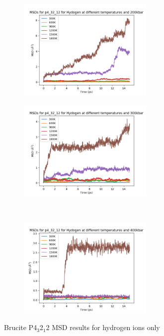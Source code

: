\documentclass[a4paper,12pt]{article}
\begin{document}
\begin{figure}[h!!!!!!!!!!!!!!!!!!!!!!!!]
	\centering
	\begin{subfigure}[t]{0.5\textwidth}
		\centering
		\includegraphics[width=6.5cm]{figures/p4_msd_H_p200.png}
		\label{Fig9a}
	\end{subfigure}%
	\begin{subfigure}[t]{0.5\textwidth}
		\centering
		\includegraphics[width=6.5cm]{figures/p4_msd_H_p300.png}
		\label{Fig9b}
	\end{subfigure}%
	\\
	\begin{subfigure}[t]{0.5\textwidth}
		\centering
		\includegraphics[width=6.5cm]{figures/p4_msd_H_p400.png}
		\label{Fig9c}
	\end{subfigure}%
	\caption{Brucite P4$_3$2$_1$2 MSD results for hydrogen ions only}
	\label{Fig9}
\end{figure}
\end{document}
